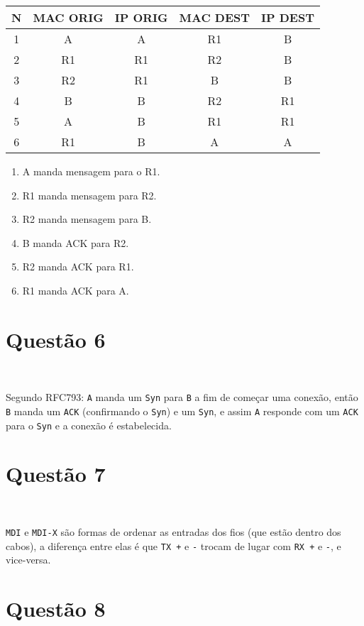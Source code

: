 \documentclass{article}
\begin{document}
\begin{tabular}{|c|c|c|c|c|}
    \hline
    N & MAC ORIG & IP ORIG & MAC DEST & IP DEST \\
    \hline
    1 & A         & A        & R1        & B        \\
    2 & R1        & R1       & R2        & B        \\
    3 & R2        & R1       & B         & B        \\
    4 & B         & B        & R2        & R1       \\
    5 & A         & B        & R1        & R1       \\
    6 & R1        & B        & A         & A        \\
    \hline
\end{tabular}

\begin{enumerate}
    \item A manda mensagem para o R1.
    \item R1 manda mensagem para R2.
    \item R2 manda mensagem para B.
    \item B manda ACK para R2.
    \item R2 manda ACK para R1.
    \item R1 manda ACK para A.
\end{enumerate}

\section*{Questão 6}\

Segundo RFC793:
\texttt{A} manda um \texttt{Syn} para \texttt{B}
a fim de começar uma conexão, então \texttt{B}
manda um \texttt{ACK} (confirmando o \texttt{Syn}) e um \texttt{Syn},
e assim \texttt{A} responde com um \texttt{ACK} para
o \texttt{Syn} e a conexão é estabelecida.

\section*{Questão 7}\

\texttt{MDI} e \texttt{MDI-X} são formas
de ordenar as entradas dos fios
(que estão dentro dos cabos),
a diferença entre elas é que
\texttt{TX +} e \texttt{-} trocam de lugar com
\texttt{RX +} e \texttt{-}, e vice-versa.

\section*{Questão 8}
\end{document}
